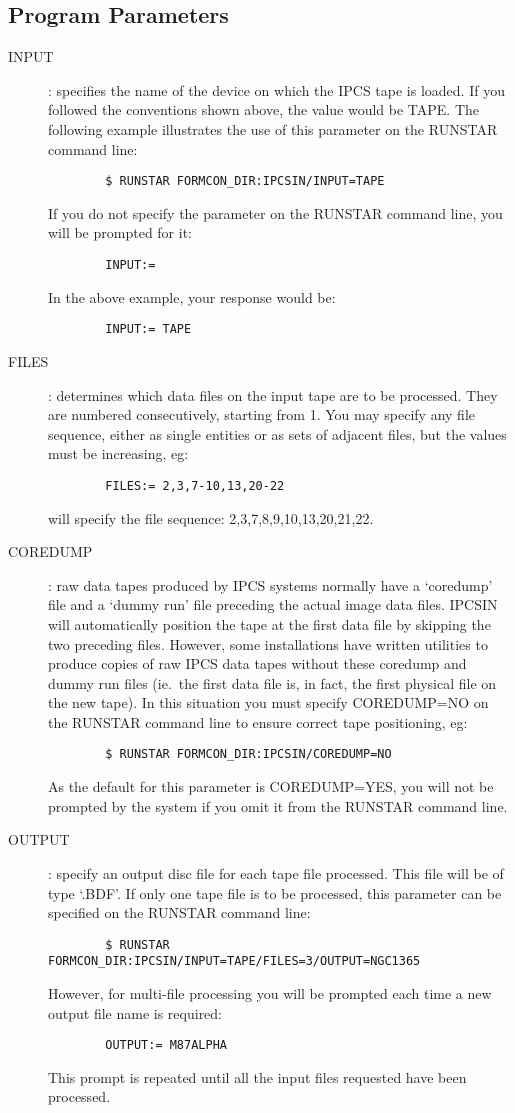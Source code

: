 \subsection {Program Parameters}
\begin{description}
\item[INPUT]:
specifies the name of the device on which the IPCS tape is loaded.
If you followed the conventions shown above, the value would be TAPE.
The following example illustrates the use of this parameter on the RUNSTAR
command line:
\begin{verbatim}
        $ RUNSTAR FORMCON_DIR:IPCSIN/INPUT=TAPE
\end{verbatim}
If you do not specify the parameter on the RUNSTAR command line, you will be
prompted for it:
\begin{verbatim}
        INPUT:=
\end{verbatim}
In the above example, your response would be:
\begin{verbatim}
        INPUT:= TAPE
\end{verbatim}
\item[FILES]:
determines which data files on the input tape are to be processed.
They are numbered consecutively, starting from 1.
You may specify any file sequence, either as single entities or as sets of
adjacent files, but the values must be increasing, eg:
\begin{verbatim}
        FILES:= 2,3,7-10,13,20-22
\end{verbatim}
will specify the file sequence: 2,3,7,8,9,10,13,20,21,22.
\item[COREDUMP]:
raw data tapes produced by IPCS systems normally have a `coredump'
file and a `dummy run' file preceding the actual image data files.
IPCSIN will automatically position the tape at the first data file by skipping
the two preceding files.
However, some installations have written utilities to produce copies of raw
IPCS data tapes without these coredump and dummy run files (ie.\ the first data
file is, in fact, the first physical file on the new tape).
In this situation you must specify COREDUMP=NO on the RUNSTAR command line to
ensure correct tape positioning, eg:
\begin{verbatim}
        $ RUNSTAR FORMCON_DIR:IPCSIN/COREDUMP=NO
\end{verbatim}
As the default for this parameter is COREDUMP=YES, you will not be prompted by
the system if you omit it from the RUNSTAR command line.
\item[OUTPUT]:
specify an output disc file for each tape file processed.
This file will be of type `.BDF'.
If only one tape file is to be processed, this parameter can be specified
on the RUNSTAR command line:
\begin{verbatim}
        $ RUNSTAR FORMCON_DIR:IPCSIN/INPUT=TAPE/FILES=3/OUTPUT=NGC1365
\end{verbatim}
However, for multi-file processing you will be prompted each time a new output
file name is required:
\begin{verbatim}
        OUTPUT:= M87ALPHA
\end{verbatim}
This prompt is repeated until all the input files requested have been processed.
\end{description}
